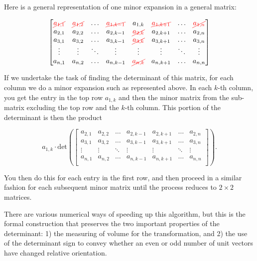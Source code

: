 \documentclass{ximera}
\begin{document}
Here is a general representation of one minor expansion in a general matrix:

$$
\begin{bmatrix}
    \textcolor{red}{\cancel{a_{1,1}}} & \textcolor{red}{\cancel{a_{1,2}}} & \ldots & \textcolor{red}{\cancel{a_{1,k-1}}} & a_{1,k} & \textcolor{red}{\cancel{a_{1,k+1}}} & \ldots & \textcolor{red}{\cancel{a_{1,n}}} \\
    a_{2,1} & a_{2,2} & \ldots & a_{2,k-1} & \textcolor{red}{\cancel{a_{2,k}}} & a_{2,k+1} & \ldots & a_{2,n} \\
    a_{3,1} & a_{3,2} & \ldots & a_{3,k-1} & \textcolor{red}{\cancel{a_{3,k}}} & a_{3,k+1} & \ldots & a_{3,n} \\
    \vdots & \vdots & \ddots & \vdots & \vdots & \vdots & \ddots & \vdots \\
    a_{n,1} & a_{n,2} & \ldots & a_{n,k-1} & \textcolor{red}{\cancel{a_{n,k}}} & a_{n,k+1} & \ldots & a_{n,n} \\
\end{bmatrix}
$$

If we undertake the task of finding the determinant of this matrix, for each column we do a minor expansion such as represented above. In each $k$-th column, you get the entry in the top row $a_{1,k}$ and then the minor matrix from the sub-matrix excluding the top row and the $k$-th column. This portion of the determinant is then the product

$$a_{1,k}\cdot\mbox{det}\left(
\begin{bmatrix}
    a_{2,1} & a_{2,2} & \ldots & a_{2,k-1} & a_{2,k+1} & \ldots & a_{2,n} \\
    a_{3,1} & a_{3,2} & \ldots & a_{3,k-1} & a_{3,k+1} & \ldots & a_{3,n} \\
    \vdots & \vdots & \ddots & \vdots & \vdots  & \ddots & \vdots \\
    a_{n,1} & a_{n,2} & \ldots & a_{n,k-1} & a_{n,k+1} & \ldots & a_{n,n} \\
\end{bmatrix}
\right).$$

You then do this for each entry in the first row, and then proceed in a similar fashion for each subsequent minor matrix until the process reduces to $2\times 2$ matrices. 

There are various numerical ways of speeding up this algorithm, but this is the formal construction that preserves the two important properties of the determinant: 1) the measuring of volume for the transformation, and 2) the use of the determinant sign to convey whether an even or odd number of unit vectors have changed relative orientation. 
\end{document}

